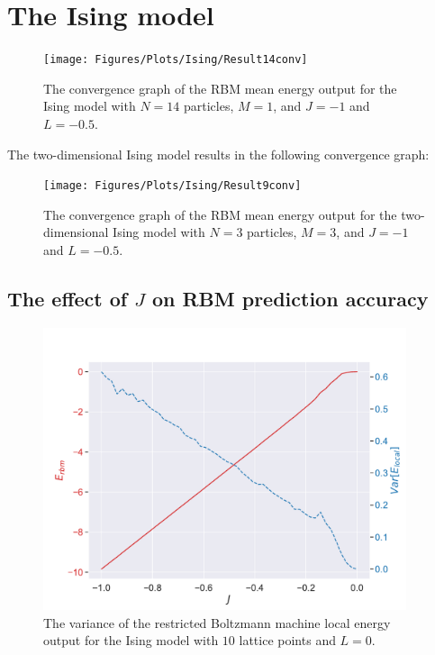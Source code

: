 \section{The Ising model}


\begin{figure}[H]
  \begin{center}
    \texttt{[image: Figures/Plots/Ising/Result14conv]}
  \end{center}
  \caption{The convergence graph of the RBM mean energy output for the Ising model with $N = 14$ particles, $M=1$, and $J=-1$ and $L=-0.5$.}
\end{figure}

The two-dimensional Ising model results in the following convergence graph:

\begin{figure}[H]
  \begin{center}
    \texttt{[image: Figures/Plots/Ising/Result9conv]}
  \end{center}
  \caption{The convergence graph of the RBM mean energy output for the two-dimensional Ising model with $N = 3$ particles, $M=3$, and $J=-1$ and $L=-0.5$.}
\end{figure}

\subsection{The effect of \texorpdfstring{$J$}{J} on RBM prediction accuracy}

\begin{figure}[H]
  \begin{center}
    \includegraphics[width=0.95\textwidth]{Figures/Plots/Ising/[J][-1.0-0.0][e=500][n=10][L=0]}
  \end{center}
  \caption{The variance of the restricted Boltzmann machine local energy output for the Ising model with $10$ lattice points and $L=0$.}
\end{figure}


